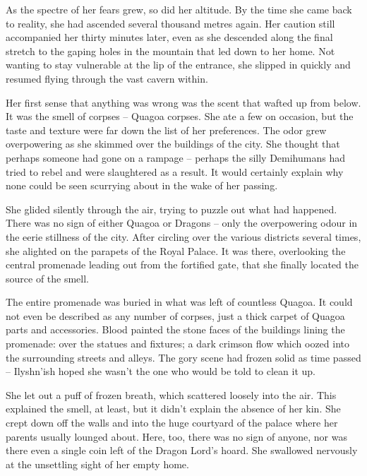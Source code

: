  

As the spectre of her fears grew, so did her altitude. By the time she came back to reality, she had ascended several thousand metres again. Her caution still accompanied her thirty minutes later, even as she descended along the final stretch to the gaping holes in the mountain that led down to her home. Not wanting to stay vulnerable at the lip of the entrance, she slipped in quickly and resumed flying through the vast cavern within.

 

Her first sense that anything was wrong was the scent that wafted up from below. It was the smell of corpses – Quagoa corpses. She ate a few on occasion, but the taste and texture were far down the list of her preferences. The odor grew overpowering as she skimmed over the buildings of the city. She thought that perhaps someone had gone on a rampage – perhaps the silly Demihumans had tried to rebel and were slaughtered as a result. It would certainly explain why none could be seen scurrying about in the wake of her passing.

 

She glided silently through the air, trying to puzzle out what had happened. There was no sign of either Quagoa or Dragons – only the overpowering odour in the eerie stillness of the city. After circling over the various districts several times, she alighted on the parapets of the Royal Palace. It was there, overlooking the central promenade leading out from the fortified gate, that she finally located the source of the smell.

 

The entire promenade was buried in what was left of countless Quagoa. It could not even be described as any number of corpses, just a thick carpet of Quagoa parts and accessories. Blood painted the stone faces of the buildings lining the promenade: over the statues and fixtures; a dark crimson flow which oozed into the surrounding streets and alleys. The gory scene had frozen solid as time passed – Ilyshn’ish hoped she wasn’t the one who would be told to clean it up.

 

She let out a puff of frozen breath, which scattered loosely into the air. This explained the smell, at least, but it didn’t explain the absence of her kin. She crept down off the walls and into the huge courtyard of the palace where her parents usually lounged about. Here, too, there was no sign of anyone, nor was there even a single coin left of the Dragon Lord’s hoard. She swallowed nervously at the unsettling sight of her empty home.

